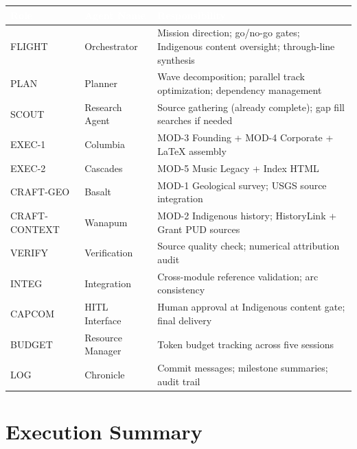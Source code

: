 \documentclass[11pt,letterpaper]{article}
\newcommand{\tableheader}[1]{\textbf{\sffamily\textcolor{white}{#1}}}
\begin{document}
\begin{center}
\begin{tabularx}{\textwidth}{L{2cm}L{3cm}X}
\toprule
{}
\tableheader{Role} & \tableheader{Agent Name} & \tableheader{Responsibility} \\
\midrule
FLIGHT & Orchestrator & Mission direction; go/no-go gates; Indigenous content oversight; through-line synthesis \\
PLAN & Planner & Wave decomposition; parallel track optimization; dependency management \\
SCOUT & Research Agent & Source gathering (already complete); gap fill searches if needed \\
EXEC-1 & Columbia & MOD-3 Founding + MOD-4 Corporate + LaTeX assembly \\
EXEC-2 & Cascades & MOD-5 Music Legacy + Index HTML \\
CRAFT-GEO & Basalt & MOD-1 Geological survey; USGS source integration \\
CRAFT-CONTEXT & Wanapum & MOD-2 Indigenous history; HistoryLink + Grant PUD sources \\
VERIFY & Verification & Source quality check; numerical attribution audit \\
INTEG & Integration & Cross-module reference validation; arc consistency \\
CAPCOM & HITL Interface & Human approval at Indigenous content gate; final delivery \\
BUDGET & Resource Manager & Token budget tracking across five sessions \\
LOG & Chronicle & Commit messages; milestone summaries; audit trail \\
\bottomrule
\end{tabularx}
\end{center}

\section{Execution Summary}
\end{document}
